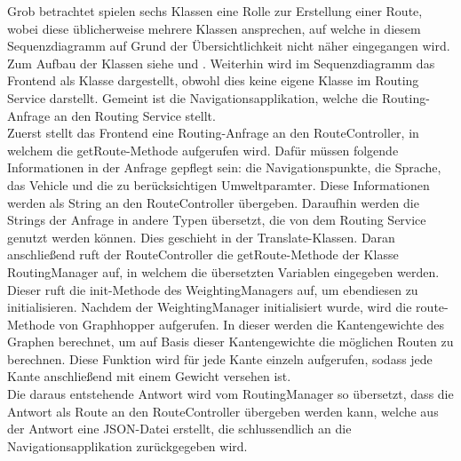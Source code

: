 Grob betrachtet spielen sechs Klassen eine Rolle zur Erstellung einer Route, wobei diese üblicherweise mehrere Klassen ansprechen, auf welche in diesem Sequenzdiagramm auf Grund der Übersichtlichkeit nicht näher eingegangen wird. Zum Aufbau der Klassen siehe  und . Weiterhin wird im Sequenzdiagramm das Frontend als Klasse dargestellt, obwohl dies keine eigene Klasse im Routing Service darstellt. Gemeint ist die Navigationsapplikation, welche die Routing-Anfrage an den Routing Service stellt. \\
Zuerst stellt das Frontend eine Routing-Anfrage an den RouteController, in welchem die getRoute-Methode aufgerufen wird. Dafür müssen folgende Informationen in der Anfrage gepflegt sein: die Navigationspunkte, die Sprache, das Vehicle und die zu berücksichtigen Umweltparamter. Diese Informationen werden als String an den RouteController übergeben. Daraufhin werden die Strings der Anfrage in andere Typen übersetzt, die von dem Routing Service genutzt werden können. Dies geschieht in der Translate-Klassen. Daran anschließend ruft der RouteController die getRoute-Methode der Klasse RoutingManager auf, in welchem die übersetzten Variablen eingegeben werden. Dieser ruft die init-Methode des WeightingManagers auf, um ebendiesen zu initialisieren. Nachdem der WeightingManager initialisiert wurde, wird die route-Methode von Graphhopper aufgerufen. In dieser werden die Kantengewichte des Graphen berechnet, um auf Basis dieser Kantengewichte die möglichen Routen zu berechnen. Diese Funktion wird für jede Kante einzeln aufgerufen, sodass jede Kante anschließend mit einem Gewicht versehen ist.\\
Die daraus entstehende Antwort wird vom RoutingManager so übersetzt, dass die Antwort als Route an den RouteController übergeben werden kann, welche aus der Antwort eine JSON-Datei erstellt, die schlussendlich an die Navigationsapplikation zurückgegeben wird.
